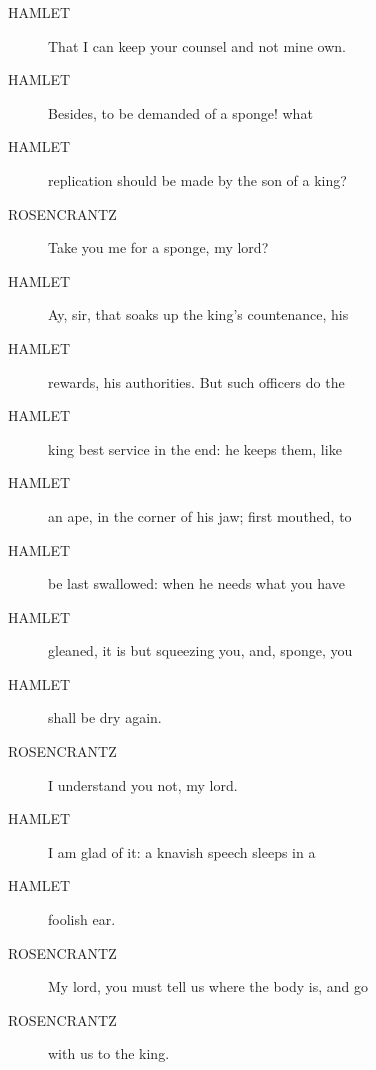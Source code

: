 \documentclass{article}
\begin{document}
\begin{description}
            
\item[HAMLET] That I can keep your counsel and not mine own.
\item[HAMLET] Besides, to be demanded of a sponge! what
\item[HAMLET] replication should be made by the son of a king?
\end{description}
          
\begin{description}
            
\item[ROSENCRANTZ] Take you me for a sponge, my lord?
\end{description}
          
\begin{description}
            
\item[HAMLET] Ay, sir, that soaks up the king's countenance, his
\item[HAMLET] rewards, his authorities. But such officers do the
\item[HAMLET] king best service in the end: he keeps them, like
\item[HAMLET] an ape, in the corner of his jaw; first mouthed, to
\item[HAMLET] be last swallowed: when he needs what you have
\item[HAMLET] gleaned, it is but squeezing you, and, sponge, you
\item[HAMLET] shall be dry again.
\end{description}
          
\begin{description}
            
\item[ROSENCRANTZ] I understand you not, my lord.
\end{description}
          
\begin{description}
            
\item[HAMLET] I am glad of it: a knavish speech sleeps in a
\item[HAMLET] foolish ear.
\end{description}
          
\begin{description}
            
\item[ROSENCRANTZ] My lord, you must tell us where the body is, and go
\item[ROSENCRANTZ] with us to the king.
\end{description}
          
\end{document}
